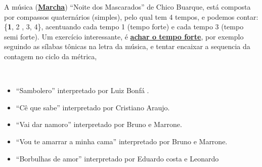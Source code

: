 \begin{example}
\label{ex:compassosimples4t}
A música (\hyperref[subsec:marcha]{\textbf{Marcha}}) ``Noite dos Mascarados'' de Chico Buarque,
está composta por compassos quaternários (simples), pelo qual tem 4 tempos,
e podemos contar: \{\textbf{1}, 2 , 3, 4\}, acentuando cada tempo 1 (tempo forte) e cada tempo 3 (tempo semi forte).
Um exercício interessante, é \hyperref[subsec:perceberTF1]{\textbf{achar o tempo forte}},
por exemplo seguindo as sílabas tônicas na letra da música,
e tentar encaixar a sequencia da contagem no ciclo da métrica, 
\end{example}

\begin{example}
~
\begin{itemize}
\item ``Sambolero'' interpretado por Luiz Bonfá \cite[pp. 49]{sambolero}.
\item ``Cê que sabe'' interpretado por Cristiano Araujo.
\item ``Vai dar namoro'' interpretado por Bruno e Marrone.
\item ``Vou te amarrar a minha cama'' interpretado por Bruno e Marrone.
\item ``Borbulhas de amor'' interpretado por Eduardo costa e Leonardo%
\end{itemize}
\end{example}

